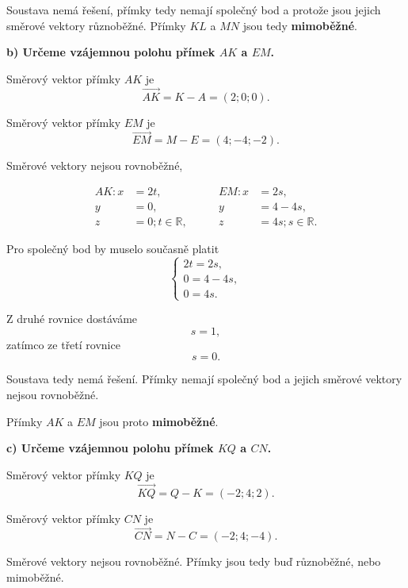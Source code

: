 \begin{example}
    Soustava nemá řešení, přímky tedy nemají společný bod a protože jsou jejich směrové vektory různoběžné.
    Přímky $KL$ a $MN$ jsou tedy \textbf{mimoběžné}.

    \textbf{b) Určeme vzájemnou polohu přímek $AK$ a $EM$.}

    Směrový vektor přímky $AK$ je
    \[
        \overrightarrow{AK}
        =K-A
        =(2;0;0).
    \]

    Směrový vektor přímky $EM$ je
    \[
        \overrightarrow{EM}
        =M-E
        =(4;-4;-2).
    \]

    Směrové vektory nejsou rovnoběžné, 
    
    \[
        \begin{aligned}
            AK: x&=2t,\\
            y&=0,\\
            z&=0; t\in\mathbb{R},
        \end{aligned}
        \qquad
        \begin{aligned}
            EM: x&=2s,\\
            y&=4-4s,\\
            z&=4s; s\in\mathbb{R}.
        \end{aligned}
    \]

    Pro společný bod by muselo současně platit
    \[
        \begin{cases}
            2t=2s,\\
            0=4-4s,\\
            0=4s.
        \end{cases}
    \]

    Z druhé rovnice dostáváme
    \[
        s=1,
    \]
    zatímco ze třetí rovnice
    \[
        s=0.
    \]

    Soustava tedy nemá řešení. Přímky nemají společný bod a jejich
    směrové vektory nejsou rovnoběžné.

    Přímky $AK$ a $EM$ jsou proto \textbf{mimoběžné}.


    \textbf{c) Určeme vzájemnou polohu přímek $KQ$ a $CN$.}

    Směrový vektor přímky $KQ$ je
    \[
        \overrightarrow{KQ}
        =Q-K
        =(-2;4;2).
    \]

    Směrový vektor přímky $CN$ je
    \[
        \overrightarrow{CN}
        =N-C
        =(-2;4;-4).
    \]

    Směrové vektory nejsou rovnoběžné. Přímky jsou tedy buď
    různoběžné, nebo mimoběžné.


\end{example}
